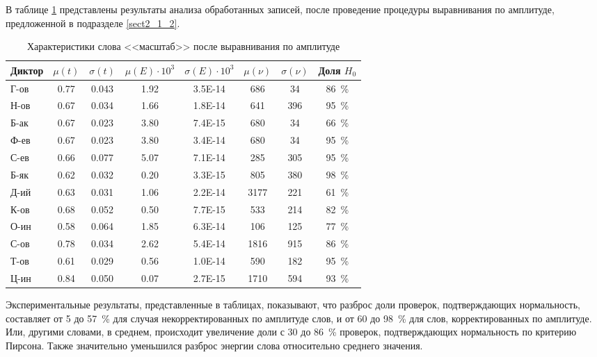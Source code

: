 В таблице \ref{tab:wordCharacteristicsAfterSmoothing} представлены результаты анализа обработанных записей, после проведение процедуры выравнивания по амплитуде, предложенной в подразделе \ref{sect2_1_2}.

\begin{table}[h]
	\centering
	\caption{Характеристики слова <<масштаб>> после выравнивания по амплитуде}
	\label{tab:wordCharacteristicsAfterSmoothing}
	{\normalsize
		\begin{tabular}{| l | c | c | c | c | c | c | c |}
			\hline
			Диктор & \phantom{0} $\mu(t)$ \phantom{0} & \phantom{0}$\sigma(t)$\phantom{0} & $\mu(E) \cdot 10^3$ & $\sigma(E) \cdot 10^3$ & \phantom{0}$\mu(\nu)$\phantom{0} & \phantom{0}$\sigma(\nu)$\phantom{0} & Доля $H_0$ \\
			\hline
			Г-ов & 0.77	& 0.043 & 1.92 & 3.5E-14 & 686  & 34  & 86~\% \\
			Н-ов & 0.67	& 0.034	& 1.66 & 1.8E-14 & 641  & 396 & 95~\% \\
			Б-ак & 0.67	& 0.023	& 3.80 & 7.4E-15 & 680  & 34  & 66~\% \\
			Ф-ев & 0.67	& 0.023	& 3.80 & 3.4E-14 & 680  & 34  & 95~\% \\
			С-ев & 0.66	& 0.077	& 5.07 & 7.1E-14 & 285  & 305 & 95~\% \\
			Б-як & 0.62	& 0.032	& 0.20 & 3.3E-15 & 805  & 380 & 98~\% \\
			Д-ий & 0.63	& 0.031	& 1.06 & 2.2E-14 & 3177 & 221 & 61~\% \\
			К-ов & 0.68	& 0.052	& 0.50 & 7.7E-15 & 533  & 214 & 82~\% \\
			О-ин & 0.58	& 0.064	& 1.85 & 6.3E-14 & 106  & 125 & 77~\% \\
			С-ов & 0.78	& 0.034	& 2.62 & 5.4E-14 & 1816 & 915 & 86~\% \\
			Т-ов & 0.61	& 0.029	& 0.56 & 1.0E-14 & 590  & 182 & 95~\% \\
			Ц-ин & 0.84	& 0.050	& 0.07 & 2.7E-15 & 1710 & 594 & 93~\% \\
			\hline
		\end{tabular}
	}
\end{table}

Экспериментальные результаты, представленные в таблицах, показывают, что разброс доли проверок, подтверждающих нормальность, составляет от 5 до 57~\% для случая некорректированных по амплитуде слов, и от 60 до 98~\% для слов, корректированных по амплитуде.
Или, другими словами, в среднем, происходит увеличение доли с 30 до 86~\% проверок, подтверждающих нормальность по критерию Пирсона.
Также значительно уменьшился разброс энергии слова относительно среднего значения. 

